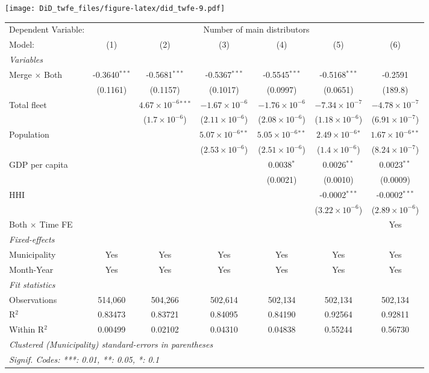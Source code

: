 \documentclass[
]{article}
\begin{document}
\texttt{[image: DiD\_twfe\_files/figure-latex/did\_twfe-9.pdf]}

\begin{tabular}{lcccccc}
\tabularnewline\midrule\midrule
Dependent Variable:&\multicolumn{6}{c}{Number of main distributors}\\
Model:&(1) & (2) & (3) & (4) & (5) & (6)\\
\midrule \emph{Variables}&   &   &   &   &   &  \\
Merge $\times $ Both & -0.3640$^{***}$ & -0.5681$^{***}$ & -0.5367$^{***}$ & -0.5545$^{***}$ & -0.5168$^{***}$ & -0.2591\\
  &(0.1161) & (0.1157) & (0.1017) & (0.0997) & (0.0651) & (189.8)\\
Total fleet &    & $4.67\times 10^{-6}$$^{***}$ & $-1.67\times 10^{-6}$ & $-1.76\times 10^{-6}$ & $-7.34\times 10^{-7}$ & $-4.78\times 10^{-7}$\\
  &   & ($1.7\times 10^{-6}$) & ($2.11\times 10^{-6}$) & ($2.08\times 10^{-6}$) & ($1.18\times 10^{-6}$) & ($6.91\times 10^{-7}$)\\
Population &    &    & $5.07\times 10^{-6}$$^{**}$ & $5.05\times 10^{-6}$$^{**}$ & $2.49\times 10^{-6}$$^{*}$ & $1.67\times 10^{-6}$$^{**}$\\
  &   &    & ($2.53\times 10^{-6}$) & ($2.51\times 10^{-6}$) & ($1.4\times 10^{-6}$) & ($8.24\times 10^{-7}$)\\
GDP per capita &    &    &    & 0.0038$^{*}$ & 0.0026$^{**}$ & 0.0023$^{**}$\\
  &   &    &    & (0.0021) & (0.0010) & (0.0009)\\
HHI &    &    &    &    & -0.0002$^{***}$ & -0.0002$^{***}$\\
  &   &    &    &    & ($3.22\times 10^{-6}$) & ($2.89\times 10^{-6}$)\\
Both $\times$ Time FE &  &  &  &  &  & Yes\\
\midrule \emph{Fixed-effects}&   &   &   &   &   &  \\
Municipality & Yes & Yes & Yes & Yes & Yes & Yes\\
Month-Year & Yes & Yes & Yes & Yes & Yes & Yes\\
\midrule \emph{Fit statistics}&  & & & & & \\
Observations & 514,060&504,266&502,614&502,134&502,134&502,134\\
R$^2$ & 0.83473&0.83721&0.84095&0.84190&0.92564&0.92811\\
Within R$^2$ & 0.00499&0.02102&0.04310&0.04838&0.55244&0.56730\\
\midrule\midrule\multicolumn{7}{l}{\emph{Clustered (Municipality) standard-errors in parentheses}}\\
\multicolumn{7}{l}{\emph{Signif. Codes: ***: 0.01, **: 0.05, *: 0.1}}\\
\end{tabular}
\end{document}
